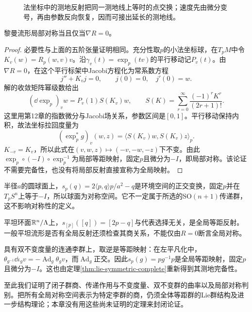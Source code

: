\begin{figure}[htbp]
\centering
\caption{法坐标中的测地反射把同一测地线上等时的点交换；速度先由微分变号，再由参数反向恢复，因而可接出延长的测地线。}
\label{fig:symmetric-reflection}
\end{figure}

\begin{theorem}[局部对称的曲率判别]\label{thm:lie-local-symmetric}
黎曼流形局部对称当且仅当$\nabla R=0$。
\end{theorem}
\begin{proof}
必要性与上面的五阶张量证明相同。充分性取$p$的小法坐标球，在$T_pM$中令$K_v(w)=R_p(w,v)v$。沿$\gamma_v(t)=\exp_p(tv)$的平行移动记$P_v(t)$。由$\nabla R=0$，在这个平行标架中Jacobi方程化为常系数方程
\[
 j''+K_vj=0,\qquad j(0)=0,\quad j'(0)=w.
\]
解的收敛矩阵幂级数给出
\[
 (\dd\exp_p)_vw=P_v(1)S(K_v)w,\qquad
 S(K)=\sum_{r=0}^{\infty}\frac{(-1)^rK^r}{(2r+1)!}.
\]
这里用第12章的指数微分与Jacobi场关系，参数区间是$[0,1]$。平行移动保持内积，故法坐标拉回度量为
\[
 (\exp_p^*g)_v(w,z)=\langle S(K_v)w,S(K_v)z\rangle_p.
\]
$K_{-v}=K_v$，所以此式在$(v,w,z)\mapsto(-v,-w,-z)$下不变。由此$\exp_p\circ(-I)\circ\exp_p^{-1}$为局部等距映射，固定$p$且微分为$-I$，即局部对称。该论证不需要完备性，也没有将局部反射直接宣称为全局映射。
\end{proof}

\begin{example}[三类全局模型]
半径$a$的圆球面上，$s_p(q)=2\langle p,q\rangle p/a^2-q$是环境空间的正交变换，固定$p$并在$T_pS^n$上等于$-I$，所以球面为对称空间。它不一定属于所选的$\mathrm{SO}(n+1)$传递群，这不影响对称性的定义。

平坦环面$\mathbb{R}^n/\Lambda$上，$s_{[p]}([q])=[2p-q]$与代表选择无关，是全局等距反射。一般平坦流形是否有全局反射还须检查其商关系，不能仅由$R=0$断言全局对称。

具有双不变度量的连通李群上，取逆是等距映射：在左平凡化中，$\theta_{g^{-1}}\dd\iota_gv=-\operatorname{Ad}_g\theta_gv$，而$\operatorname{Ad}_g$正交。因此$s_p(g)=pg^{-1}p$是全局等距映射，固定$p$且微分为$-I$。这也由定理\ref{thm:lie-symmetric-complete}重新得到其测地完备性。
\end{example}

至此我们证明了闭子群商、传递作用与不变度量、双不变群的曲率以及局部对称判别。把所有全局对称空间表示为特定李群的商，仍须全体等距群的Lie群结构及进一步结构理论；本章没有用这些尚未证明的定理来封闭论证。
